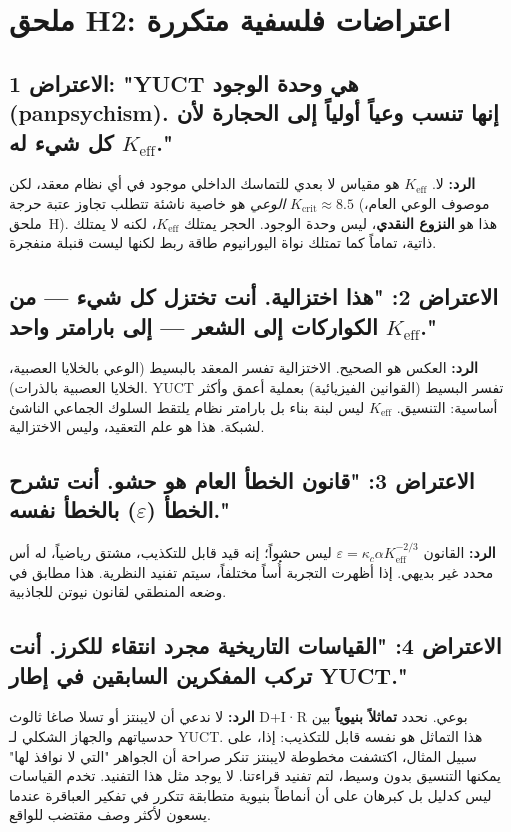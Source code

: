 \documentclass[12pt,a4paper]{article}
\newcommand{\Keff}{K_{\mathrm{eff}}}
\begin{document}
	\section*{ملحق H2: اعتراضات فلسفية متكررة}
	
	\subsection*{الاعتراض 1: "YUCT هي وحدة الوجود (panpsychism). إنها تنسب وعياً أولياً إلى الحجارة لأن كل شيء له \(\Keff\)."}
	
	\textbf{الرد:} لا. \(\Keff\) هو مقياس لا بعدي للتماسك الداخلي موجود في أي نظام معقد، لكن \emph{الوعي} هو خاصية ناشئة تتطلب تجاوز عتبة حرجة \(K_{\mathrm{crit}} \approx 8.5\) (موصوف الوعي العام، ملحق~H). هذا هو \textbf{النزوع النقدي}، ليس وحدة الوجود. الحجر يمتلك \(\Keff\)، لكنه لا يمتلك ذاتية، تماماً كما تمتلك نواة اليورانيوم طاقة ربط لكنها ليست قنبلة منفجرة.
	
	\subsection*{الاعتراض 2: "هذا اختزالية. أنت تختزل كل شيء — من الكواركات إلى الشعر — إلى بارامتر واحد \(\Keff\)."}
	
	\textbf{الرد:} العكس هو الصحيح. الاختزالية تفسر المعقد بالبسيط (الوعي بالخلايا العصبية، الخلايا العصبية بالذرات). YUCT تفسر البسيط (القوانين الفيزيائية) بعملية أعمق وأكثر أساسية: التنسيق. \(\Keff\) ليس لبنة بناء بل بارامتر نظام يلتقط السلوك الجماعي الناشئ لشبكة. هذا هو علم التعقيد، وليس الاختزالية.
	
	\subsection*{الاعتراض 3: "قانون الخطأ العام هو حشو. أنت تشرح الخطأ (\(\varepsilon\)) بالخطأ نفسه."}
	
	\textbf{الرد:} القانون \(\varepsilon = \kappa_c \alpha \Keff^{-2/3}\) ليس حشواً؛ إنه قيد قابل للتكذيب، مشتق رياضياً، له أس محدد غير بديهي. إذا أظهرت التجربة أُساً مختلفاً، سيتم تفنيد النظرية. هذا مطابق في وضعه المنطقي لقانون نيوتن للجاذبية.
	
	\subsection*{الاعتراض 4: "القياسات التاريخية مجرد انتقاء للكرز. أنت تركب المفكرين السابقين في إطار YUCT."}
	
	\textbf{الرد:} لا ندعي أن لايبنتز أو تسلا صاغا ثالوث D+I·R بوعي. نحدد \textbf{تماثلاً بنيوياً} بين حدسياتهم والجهاز الشكلي لـ YUCT. هذا التماثل هو نفسه قابل للتكذيب: إذا، على سبيل المثال، اكتشفت مخطوطة لايبنتز تنكر صراحة أن الجواهر "التي لا نوافذ لها" يمكنها التنسيق بدون وسيط، لتم تفنيد قراءتنا. لا يوجد مثل هذا التفنيد. تخدم القياسات ليس كدليل بل كبرهان على أن أنماطاً بنيوية متطابقة تتكرر في تفكير العباقرة عندما يسعون لأكثر وصف مقتضب للواقع.
	
\end{document}

